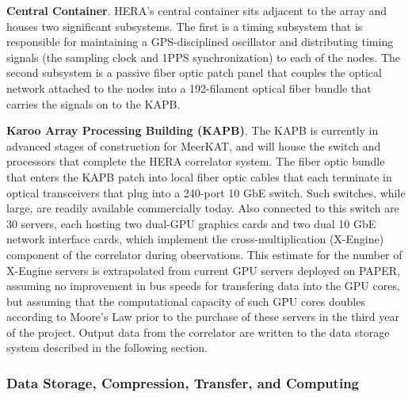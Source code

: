 \documentclass[preprint]{aastex}
\newcommand{\compress}{\vspace{-0.3in}}
\begin{document}
\noindent
{\bf Central Container}.
HERA's central container sits adjacent to the array and houses two significant subsystems.  The first is a timing subsystem
that is responsible for maintaining a GPS-disciplined oscillator and distributing timing
signals (the sampling clock and 1PPS synchronization) to each of the nodes.  The second
subsystem is a passive fiber optic patch panel that couples
the optical network attached to the nodes into a 192-filament optical fiber bundle 
that carries the signals on to the KAPB. 

\noindent
{\bf Karoo Array Processing Building (KAPB)}.
The KAPB is currently
in advanced stages of construction for MeerKAT, and will house the switch and processors
that 
complete the HERA correlator system.  The fiber optic bundle that enters the KAPB patch
into local fiber optic cables 
that each terminate in optical transceivers that plug into a 240-port 10 GbE switch.
Such switches, while large, are readily available commercially today.  Also connected to
this switch are 30 servers, each hosting two dual-GPU graphics cards and two dual
10 GbE network interface cards, which implement the cross-multiplication (X-Engine) component
of the correlator during observations.  This estimate for the number of X-Engine servers
is extrapolated from current GPU servers deployed on PAPER, assuming no improvement in bus
speeds for transfering data into the GPU cores, but assuming that the computational
capacity of such GPU cores doubles according to Moore's Law prior to the purchase of
these servers in the third year of the project.
Output data from the correlator are written to the data storage system described
in the following section.



\compress
\subsubsection{Data Storage, Compression, Transfer, and Computing}
\label{sec:data}
\end{document}
